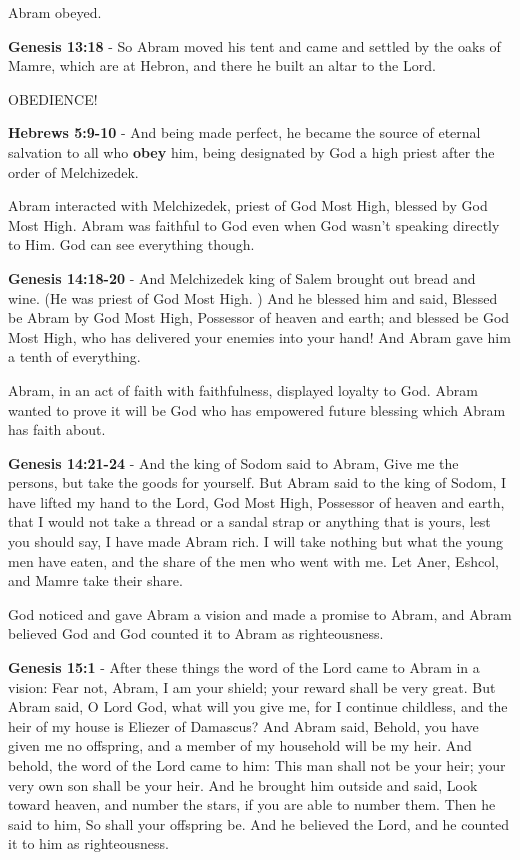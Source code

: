 \documentclass[11pt]{article}
\begin{document}
Abram obeyed.

\textbf{Genesis 13:18} - So Abram moved his tent and came and settled by the oaks of Mamre, which are at Hebron, and there he built an altar to the Lord.

OBEDIENCE!

\textbf{Hebrews 5:9-10} - And being made perfect, he became the source of eternal salvation to all who \textbf{obey} him, being designated by God a high priest after the order of Melchizedek.

Abram interacted with Melchizedek, priest of God Most High, blessed by God Most High. Abram was faithful to God even when God wasn't speaking directly to Him. God can see everything though.

\textbf{Genesis 14:18-20} - And Melchizedek king of Salem brought out bread and wine. (He was priest of God Most High. ) And he blessed him and said, Blessed be Abram by God Most High, Possessor of heaven and earth; and blessed be God Most High, who has delivered your enemies into your hand! And Abram gave him a tenth of everything.

Abram, in an act of faith with faithfulness, displayed loyalty to God. Abram wanted to prove it will be God who has empowered future blessing which Abram has faith about.

\textbf{Genesis 14:21-24} - And the king of Sodom said to Abram, Give me the persons, but take the goods for yourself.  But Abram said to the king of Sodom, I have lifted my hand to the Lord, God Most High, Possessor of heaven and earth, that I would not take a thread or a sandal strap or anything that is yours, lest you should say, I have made Abram rich.  I will take nothing but what the young men have eaten, and the share of the men who went with me. Let Aner, Eshcol, and Mamre take their share.

God noticed and gave Abram a vision and made a promise to Abram, and Abram believed God and God counted it to Abram as righteousness.

\textbf{Genesis 15:1} - After these things the word of the Lord came to Abram in a vision: Fear not, Abram, I am your shield; your reward shall be very great.  But Abram said, O Lord God, what will you give me, for I continue childless, and the heir of my house is Eliezer of Damascus?  And Abram said, Behold, you have given me no offspring, and a member of my household will be my heir.  And behold, the word of the Lord came to him: This man shall not be your heir; your very own son shall be your heir.  And he brought him outside and said, Look toward heaven, and number the stars, if you are able to number them. Then he said to him, So shall your offspring be.  And he believed the Lord, and he counted it to him as righteousness.
\end{document}

